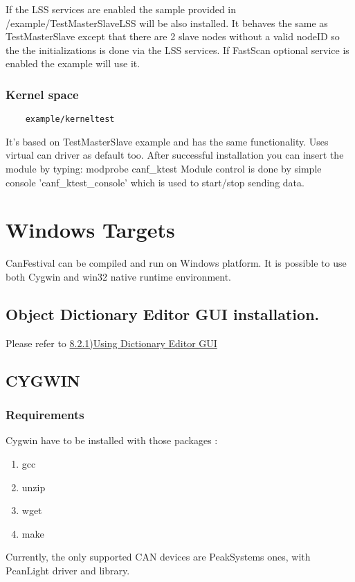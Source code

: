 \documentclass[12pt,english,a4paper]{book}
\begin{document}
If the LSS services are enabled the sample provided in /example/TestMasterSlaveLSS will be also installed. It behaves the same as TestMasterSlave except that there are 2 slave nodes without a valid nodeID so the the initializations is done via  the LSS services. If FastScan optional service is enabled the example will use it. 

\subsubsection{Kernel space}


\begin{verbatim}
	example/kerneltest
\end{verbatim}


It's based on TestMasterSlave example
and has the same functionality. Uses virtual can driver as default
too. After successful installation you can insert the module by typing:
modprobe canf\_ktest Module control is done by simple console 'canf\_ktest\_console'
which is used to start/stop sending data.


\section{Windows Targets}

CanFestival can be compiled and run on Windows platform. It is possible
to use both Cygwin and win32 native runtime environment.

\subsection{Object Dictionary Editor GUI installation.}

Please refer to \hyperlink{a821UsingDictionaryEditorGUIoutline}{8.2.1)Using
Dictionary Editor GUI}

\subsection{CYGWIN}

\subsubsection{Requirements}

Cygwin have to be installed with those packages :

\begin{enumerate}
\item gcc 
\item unzip 
\item wget 
\item make 
\end{enumerate}
Currently, the only supported CAN devices are PeakSystems ones, with
PcanLight driver and library.
\end{document}
